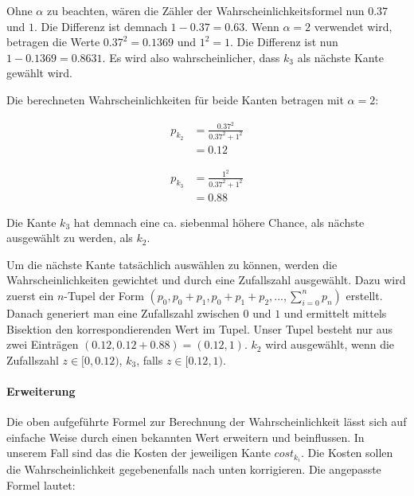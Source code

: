 \noindent
Ohne $\alpha$ zu beachten, wären die Zähler der Wahrscheinlichkeitsformel nun $0.37$ und $1$. Die Differenz ist demnach $1 - 0.37 = 0.63$. Wenn $\alpha = 2$ verwendet wird, betragen die Werte $0.37^2 = 0.1369$ und $1^2 = 1$. Die Differenz ist nun $1 - 0.1369 = 0.8631$. Es wird also wahrscheinlicher, dass $k_3$ als nächste Kante gewählt wird.

Die berechneten Wahrscheinlichkeiten für beide Kanten betragen mit $\alpha = 2$:

\begin{equation*}
\begin{split}
p_{k_2} & = \frac{0.37^2}{0.37^2 + 1^2} \\
        & = 0.12
\end{split}
\end{equation*}

\begin{equation*}
\begin{split}
p_{k_3} & = \frac{1^2}{0.37^2 + 1^2} \\
        & = 0.88
\end{split}
\end{equation*}

\noindent
Die Kante $k_3$ hat demnach eine ca. siebenmal höhere Chance, als nächste ausgewählt zu werden, als $k_2$.

Um die nächste Kante tatsächlich auswählen zu können, werden die Wahrscheinlichkeiten gewichtet und durch eine Zufallszahl ausgewählt. Dazu wird zuerst ein $n$-Tupel der Form $(p_0, p_0 + p_1, p_0 + p_1 + p_2, ..., \sum\nolimits_{i=0}^n p_n)$ erstellt. Danach generiert man eine Zufallszahl zwischen $0$ und $1$ und ermittelt mittels Bisektion den korrespondierenden Wert im Tupel. Unser Tupel besteht nur aus zwei Einträgen $(0.12, 0.12 + 0.88) = (0.12, 1)$. $k_2$ wird ausgewählt, wenn die Zufallszahl $z \in [0, 0.12)$, $k_3$, falls $z \in [0.12, 1)$.



\paragraph*{Erweiterung}

Die oben aufgeführte Formel zur Berechnung der Wahrscheinlichkeit lässt sich auf einfache Weise durch einen bekannten Wert erweitern und beinflussen. In unserem Fall sind das die Kosten der jeweiligen Kante $cost_{k_i}$. Die Kosten sollen die Wahrscheinlichkeit gegebenenfalls nach unten korrigieren. Die angepasste Formel lautet:

